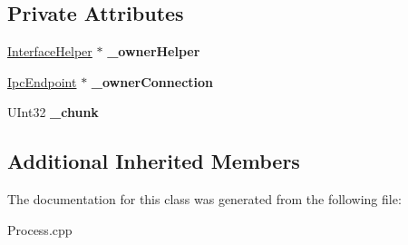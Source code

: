 \subsection*{Private Attributes}
\begin{DoxyCompactItemize}
\item 
\mbox{\label{class_binary_map_aa0a1044f0f0262e7651ca196447c66e6}} 
\hyperlink{class_interface_helper}{Interface\+Helper} $\ast$ {\bfseries \+\_\+owner\+Helper}
\item 
\mbox{\label{class_binary_map_a24e66d94a55bae51d048fc0e691f4f72}} 
\hyperlink{class_ipc_endpoint}{Ipc\+Endpoint} $\ast$ {\bfseries \+\_\+owner\+Connection}
\item 
\mbox{\label{class_binary_map_ab80baabca4a1072238ad30f57e9bc6ea}} 
U\+Int32 {\bfseries \+\_\+chunk}
\end{DoxyCompactItemize}
\subsection*{Additional Inherited Members}


The documentation for this class was generated from the following file\+:\begin{DoxyCompactItemize}
\item 
Process.\+cpp\end{DoxyCompactItemize}
